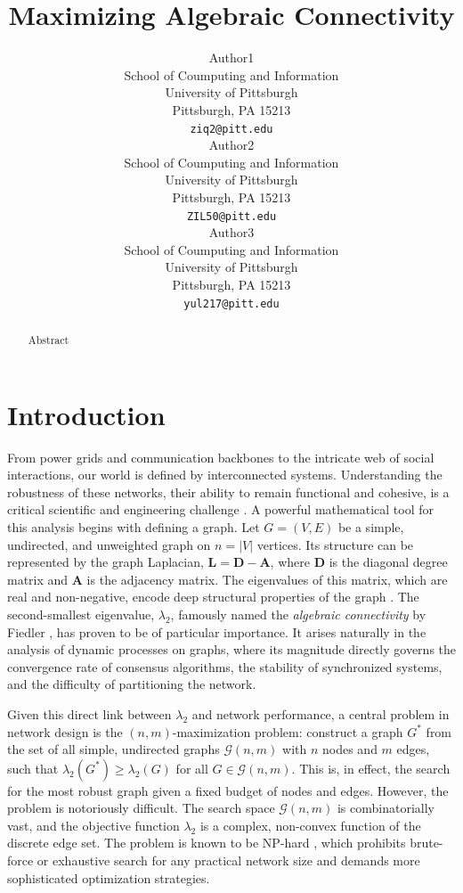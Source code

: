 \documentclass{article}
\title{Maximizing Algebraic Connectivity}
\author{
Author1 \\
  School of Coumputing and Information\\
  University of Pittsburgh\\
  Pittsburgh, PA 15213 \\
  \texttt{ziq2@pitt.edu} \\
   \And
Author2 \\
  School of Coumputing and Information\\
  University of Pittsburgh\\
  Pittsburgh, PA 15213 \\
  \texttt{ZIL50@pitt.edu} \\
  \And
Author3 \\
  School of Coumputing and Information\\
  University of Pittsburgh\\
  Pittsburgh, PA 15213 \\
  \texttt{yul217@pitt.edu} \\
}
\begin{document}
\maketitle
\begin{abstract}
Abstract
\end{abstract}




\section{Introduction}

From power grids and communication backbones to the intricate web of social interactions, our world is defined by interconnected systems. Understanding the robustness of these networks, their ability to remain functional and cohesive, is a critical scientific and engineering challenge \cite{watts1998collective}. A powerful mathematical tool for this analysis begins with defining a graph. Let $G = (V, E)$ be a simple, undirected, and unweighted graph on $n = |V|$ vertices. Its structure can be represented by the graph Laplacian, $\mathbf{L} = \mathbf{D} - \mathbf{A}$, where $\mathbf{D}$ is the diagonal degree matrix and $\mathbf{A}$ is the adjacency matrix. The eigenvalues of this matrix, which are real and non-negative, encode deep structural properties of the graph \cite{biyikoglu2007laplacian}. The second-smallest eigenvalue, $\lambda_2$, famously named the \textit{algebraic connectivity} by Fiedler \cite{fiedler1973algebraic}, has proven to be of particular importance. It arises naturally in the analysis of dynamic processes on graphs, where its magnitude directly governs the convergence rate of consensus algorithms, the stability of synchronized systems, and the difficulty of partitioning the network.

Given this direct link between $\lambda_2$ and network performance, a central problem in network design is the $(n, m)$-maximization problem: construct a graph $G^*$ from the set of all simple, undirected graphs $\mathcal{G}(n, m)$ with $n$ nodes and $m$ edges, such that $\lambda_2(G^*) \ge \lambda_2(G)$ for all $G \in \mathcal{G}(n, m)$. This is, in effect, the search for the most robust graph given a fixed budget of nodes and edges. However, the problem is notoriously difficult. The search space $\mathcal{G}(n, m)$ is combinatorially vast, and the objective function $\lambda_2$ is a complex, non-convex function of the discrete edge set. The problem is known to be NP-hard \cite{das2004max}, which prohibits brute-force or exhaustive search for any practical network size and demands more sophisticated optimization strategies.
\end{document}
